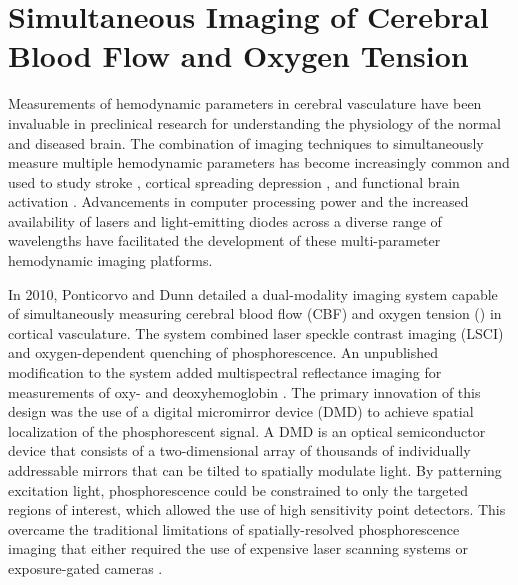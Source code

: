 
\chapter{Simultaneous Imaging of Cerebral Blood Flow and Oxygen Tension} \label{ch:system}

Measurements of hemodynamic parameters in cerebral vasculature have been invaluable in preclinical research for understanding the physiology of the normal and diseased brain. The combination of imaging techniques to simultaneously measure multiple hemodynamic parameters has become increasingly common and used to study stroke \cite{Jones:2008gb}, cortical spreading depression \cite{Sakadzic:2009jo}, and functional brain activation \cite{Dunn:2005gw, Dunn:2003wy}. Advancements in computer processing power and the increased availability of lasers and light-emitting diodes across a diverse range of wavelengths have facilitated the development of these multi-parameter hemodynamic imaging platforms.

In 2010, Ponticorvo and Dunn \cite{Ponticorvo:2010uv} detailed a dual-modality imaging system capable of simultaneously measuring cerebral blood flow (CBF) and oxygen tension () in cortical vasculature. The system combined laser speckle contrast imaging (LSCI) and oxygen-dependent quenching of phosphorescence. An unpublished modification to the system added multispectral reflectance imaging for measurements of oxy- and deoxyhemoglobin \cite{Ponticorvo:2010ur}. The primary innovation of this design was the use of a digital micromirror device (DMD) to achieve spatial localization of the phosphorescent signal. A DMD is an optical semiconductor device that consists of a two-dimensional array of thousands of individually addressable mirrors that can be tilted to spatially modulate light. By patterning excitation light, phosphorescence could be constrained to only the targeted regions of interest, which allowed the use of high sensitivity point detectors. This overcame the traditional limitations of spatially-resolved phosphorescence imaging that either required the use of expensive laser scanning systems \cite{Yaseen:2009ep, Kazmi:2013ey} or exposure-gated cameras \cite{Shonat:2003ia, Sakadzic:2009jo}.

